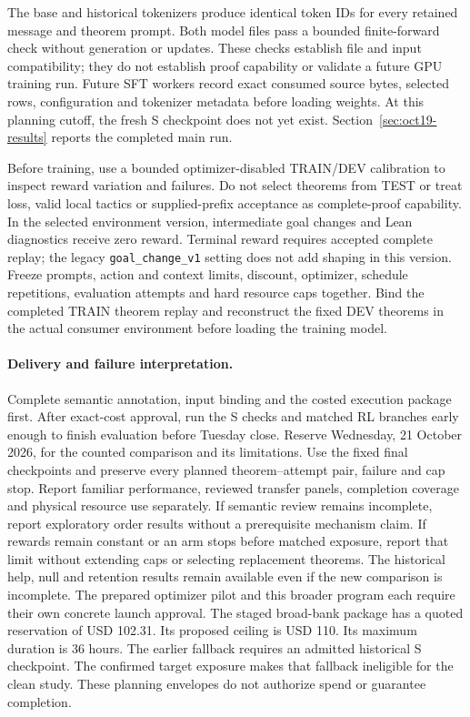 \documentclass[11pt]{article}
\newcommand{\code}[1]{\texttt{#1}}
\begin{document}
The base and historical tokenizers produce identical token IDs for every retained message and theorem prompt.
Both model files pass a bounded finite-forward check without generation or updates.
These checks establish file and input compatibility; they do not establish proof capability or validate a future GPU training run.
Future SFT workers record exact consumed source bytes, selected rows, configuration and tokenizer metadata before loading weights.
At this planning cutoff, the fresh S checkpoint does not yet exist.
Section~\ref{sec:oct19-results} reports the completed main run.

Before training, use a bounded optimizer-disabled TRAIN/DEV calibration to inspect reward variation and failures.
Do not select theorems from TEST or treat loss, valid local tactics or supplied-prefix acceptance as complete-proof capability.
In the selected environment version, intermediate goal changes and Lean diagnostics receive zero reward.
Terminal reward requires accepted complete replay; the legacy \code{goal\_change\_v1} setting does not add shaping in this version.
Freeze prompts, action and context limits, discount, optimizer, schedule repetitions, evaluation attempts and hard resource caps together.
Bind the completed TRAIN theorem replay and reconstruct the fixed DEV theorems in the actual consumer environment before loading the training model.

\paragraph{Delivery and failure interpretation.}
Complete semantic annotation, input binding and the costed execution package first.
After exact-cost approval, run the S checks and matched RL branches early enough to finish evaluation before Tuesday close.
Reserve Wednesday, 21 October 2026, for the counted comparison and its limitations.
Use the fixed final checkpoints and preserve every planned theorem--attempt pair, failure and cap stop.
Report familiar performance, reviewed transfer panels, completion coverage and physical resource use separately.
If semantic review remains incomplete, report exploratory order results without a prerequisite mechanism claim.
If rewards remain constant or an arm stops before matched exposure, report that limit without extending caps or selecting replacement theorems.
The historical help, null and retention results remain available even if the new comparison is incomplete.
The prepared optimizer pilot and this broader program each require their own concrete launch approval.
The staged broad-bank package has a quoted reservation of USD 102.31.
Its proposed ceiling is USD 110.
Its maximum duration is 36 hours.
The earlier fallback requires an admitted historical S checkpoint.
The confirmed target exposure makes that fallback ineligible for the clean study.
These planning envelopes do not authorize spend or guarantee completion.
\end{document}
